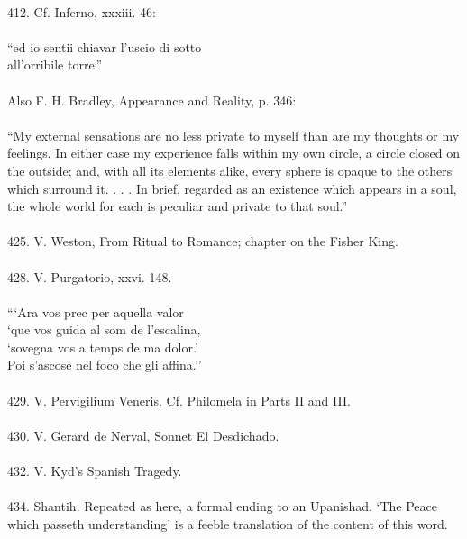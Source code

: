 \documentclass{article}
\begin{document}
 \\
412.  Cf.  Inferno, xxxiii.  46: \\
 \\
\indent\indent          ``ed io sentii chiavar l'uscio di sotto \\
\indent\indent          all'orribile torre.'' \\
 \\
Also F. H. Bradley, Appearance and Reality, p.  346: \\
 \\
``My external sensations are no less private to myself than are my
thoughts or my feelings.  In either case my experience falls within
my own circle, a circle closed on the outside; and, with all its
elements alike, every sphere is opaque to the others which surround
it. . . . In brief, regarded as an existence which appears in a soul,
the whole world for each is peculiar and private to that soul.'' \\
 \\
425.  V. Weston, From Ritual to Romance; chapter on the Fisher King. \\
 \\
428.  V.  Purgatorio, xxvi.  148. \\
 \\
 \indent\indent         ```Ara vos prec per aquella valor \\
\indent\indent           `que vos guida al som de l'escalina, \\
\indent\indent           `sovegna vos a temps de ma dolor.' \\
\indent\indent            Poi s'ascose nel foco che gli affina.'' \\
 \\
429.  V.  Pervigilium Veneris.  Cf.  Philomela in Parts II and III. \\
 \\
430.  V. Gerard de Nerval, Sonnet El Desdichado. \\
 \\
432.  V. Kyd's Spanish Tragedy. \\
 \\
434.  Shantih.  Repeated as here, a formal ending to an Upanishad.
`The Peace which passeth understanding' is a feeble translation
of the content of this word. \\
\end{document}
